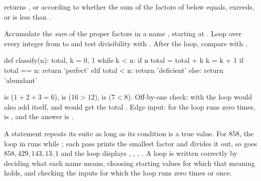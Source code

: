 \documentclass[10pt]{scrartcl}
\begin{document}
\begin{example*}
 returns ,  or  according to whether the sum of the factors of  below  equals, exceeds, or is less than .
\begin{steps}
  \ii Accumulate the \emph{sum} of the proper factors in a name , starting at .
  \ii Loop over every integer  from  to  and test divisibility with .
  \ii After the loop, compare  with .
\end{steps}
\begin{py}
def classify(n):
    total, k = 0, 1
    while k < n:
        if n %
            total = total + k
        k = k + 1
    if total == n:
        return 'perfect'
    elif total < n:
        return 'deficient'
    else:
        return 'abundant'
\end{py}
 is  ($1+2+3=6$),  is  ($16>12$),  is  ($7<8$). Off-by-one check: with  the loop would also add  itself, and  would get the total . Edge input: for  the loop runs zero times,  is , and the answer is .
\end{example*}

\revisit A  statement repeats its suite as long as its condition is a true value. For $858$, the loop in  runs while ; each pass prints the smallest factor and divides it out, so  goes $858, 429, 143, 13, 1$ and the loop displays , , , . A loop is written correctly by deciding what each name means, choosing starting values for which that meaning holds, and checking the inputs for which the loop runs zero times or once.
\end{document}
